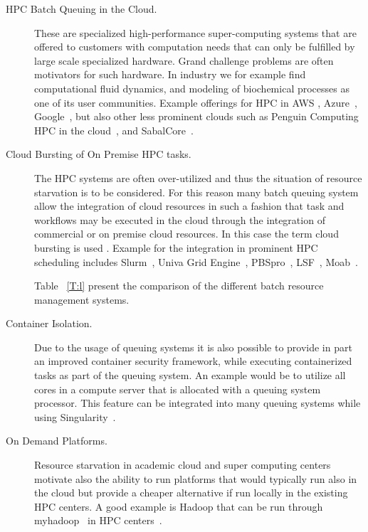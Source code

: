 \documentclass[final,5p,times,twocolumn]{elsarticle}
\begin{document}
\begin{description}

\item[HPC Batch Queuing in the Cloud.] These are specialized
  high-performance super-computing systems that are offered to
  customers with computation needs that can only be fulfilled by large
  scale specialized hardware. Grand challenge problems are often
  motivators for such hardware. In industry we for example find
  computational fluid dynamics, and modeling of biochemical processes
  as one of its user communities. Example offerings for HPC in AWS
  \cite{www-aws-hpc}, Azure~\cite{www-azure-hpc}, Google~\cite{www-google-hpc},
  but also other less prominent clouds such as Penguin Computing HPC
  in the cloud~\cite{PODHPCCloud2019}, and
  SabalCore~\cite{Sabalcore2019}.
  
\item[Cloud Bursting of On Premise HPC tasks.] The HPC systems are
  often over-utilized and thus the situation of resource starvation is
  to be considered. For this reason many batch queuing system allow
  the integration of cloud resources in such a fashion that task and
  workflows may be executed in the cloud through the integration of
  commercial or on premise cloud resources. In this case the term
  cloud bursting is used
  \cite{CloudBursting2019,BurstingHPC2019}. Example for the
  integration in prominent HPC scheduling includes
  Slurm~\cite{www-slurm}, Univa Grid Engine~\cite{www-univa},
  PBSpro~\cite{www-pbs-manual}, LSF~\cite{www-lsf},
  Moab~\cite{www-moab}.

  \color{red}
  Table ~\ref{T:l} present the comparison of the different batch resource management systems.
  
  \color{black}

\item[Container Isolation.] Due to the usage of queuing systems it is
  also possible to provide in part an improved container security
  framework, while executing containerized tasks as part of the
  queuing system. An example would be to utilize all cores in a
  compute server that is allocated with a queuing system
  processor. This feature can be integrated into many queuing systems
  while using Singularity~\cite{www-singularity}.

\item[On Demand Platforms.] Resource starvation in academic cloud and
  super computing centers motivate also the ability to run platforms
  that would typically run also in the cloud but provide a cheaper
  alternative if run locally in the existing HPC centers. A good
  example is Hadoop that can be run through
  myhadoop~\cite{krishnan2011myhadoop} in HPC centers~\cite{SDSC2019}.


\end{description}
\end{document}

